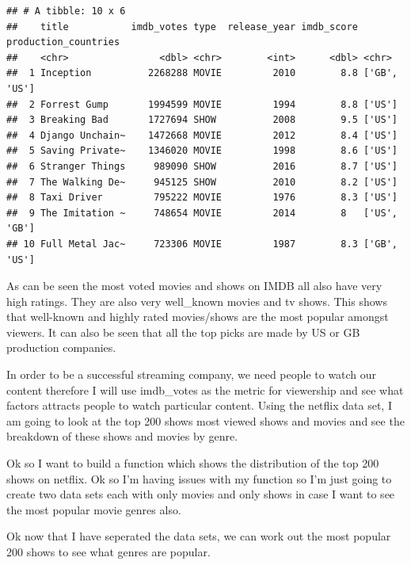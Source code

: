 \documentclass[11pt,preprint, authoryear]{elsarticle}
\numberwithin{equation}{section}
\numberwithin{figure}{section}
\numberwithin{table}{section}
\begin{document}
\begin{verbatim}
## # A tibble: 10 x 6
##    title           imdb_votes type  release_year imdb_score production_countries
##    <chr>                <dbl> <chr>        <int>      <dbl> <chr>               
##  1 Inception          2268288 MOVIE         2010        8.8 ['GB', 'US']        
##  2 Forrest Gump       1994599 MOVIE         1994        8.8 ['US']              
##  3 Breaking Bad       1727694 SHOW          2008        9.5 ['US']              
##  4 Django Unchain~    1472668 MOVIE         2012        8.4 ['US']              
##  5 Saving Private~    1346020 MOVIE         1998        8.6 ['US']              
##  6 Stranger Things     989090 SHOW          2016        8.7 ['US']              
##  7 The Walking De~     945125 SHOW          2010        8.2 ['US']              
##  8 Taxi Driver         795222 MOVIE         1976        8.3 ['US']              
##  9 The Imitation ~     748654 MOVIE         2014        8   ['US', 'GB']        
## 10 Full Metal Jac~     723306 MOVIE         1987        8.3 ['GB', 'US']
\end{verbatim}

As can be seen the most voted movies and shows on IMDB all also have
very high ratings. They are also very well\_known movies and tv shows.
This shows that well-known and highly rated movies/shows are the most
popular amongst viewers. It can also be seen that all the top picks are
made by US or GB production companies.

In order to be a successful streaming company, we need people to watch
our content therefore I will use imdb\_votes as the metric for
viewership and see what factors attracts people to watch particular
content. Using the netflix data set, I am going to look at the top 200
shows most viewed shows and movies and see the breakdown of these shows
and movies by genre.

Ok so I want to build a function which shows the distribution of the top
200 shows on netflix. Ok so I'm having issues with my function so I'm
just going to create two data sets each with only movies and only shows
in case I want to see the most popular movie genres also.

Ok now that I have seperated the data sets, we can work out the most
popular 200 shows to see what genres are popular.
\end{document}
